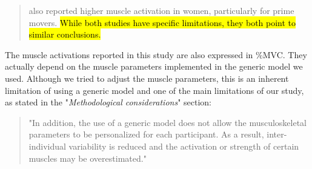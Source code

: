 \documentclass[preprint,review,12pt]{elsarticle}
\begin{document}
    \begin{quote}
        \citet{Bouffard2019-fd} also reported higher muscle activation in women, particularly for prime movers.
        \hl{While both studies have specific limitations, they both point to similar conclusions.}
    \end{quote}

    The muscle activations reported in this study are also expressed in \%MVC\@.
    They actually depend on the muscle parameters implemented in the generic model we used.
    Although we tried to adjust the muscle parameters, this is an inherent limitation of using a generic model and one of the main limitations of our study, as stated in the "\textit{Methodological considerations}" section:

    \begin{quote}
        "In addition, the use of a generic model does not allow the musculoskeletal parameters to be personalized for each participant.
        As a result, inter-individual variability is reduced and the activation or strength of certain muscles may be overestimated."
    \end{quote}

    
\end{document}
